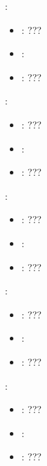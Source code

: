 \begin{itemize}
{\begin{itemize}
           \end{itemize}
    \item {}:
           \begin{itemize}
                \item \optionPossibleValues{}: ???
                \item \optionDefaultValue{}: 
                \item \optionDescrption{}: ???
           \end{itemize}
    \item {}:
           \begin{itemize}
                \item \optionPossibleValues{}: ???
                \item \optionDefaultValue{}: 
                \item \optionDescrption{}: ???
           \end{itemize}
    \item {}:
           \begin{itemize}
                \item \optionPossibleValues{}: ???
                \item \optionDefaultValue{}: 
                \item \optionDescrption{}: ???
           \end{itemize}
    \item {}:
           \begin{itemize}
                \item \optionPossibleValues{}: ???
                \item \optionDefaultValue{}: 
                \item \optionDescrption{}: ???
           \end{itemize}
    \item {}:
           \begin{itemize}
                \item \optionPossibleValues{}: ???
                \item \optionDefaultValue{}: 
                \item \optionDescrption{}: ???
           \end{itemize}
}
\end{itemize}
